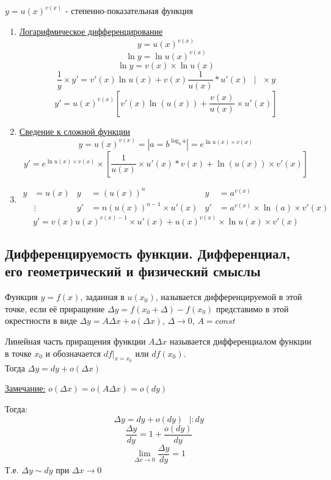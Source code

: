 \documentclass[12pt]{article}
\begin{document}
\begin{enumerate}
        $y = u(x)^{v(x)}$ - степенно-показательная функция
        \begin{enumerate}
            \item \underline{Логарифмическое дифференцирование}\\
            \[ y = u(x)^{v(x)} \]
            \[ \ln y = \ln u(x)^{v(x)} \]
            \[ \ln y = v(x) \times \ln u(x) \]
            \[ \frac{1}{y} \times y' = v'(x)\ln u(x) + v(x)\frac{1}{u(x)}*u'(x) \text{ } \big| \text{ } \times y \]
            \[ y' = u(x)^{v(x)}\left[v'(x)\ln(u(x)) + \frac{v(x)}{u(x)} \times u'(x)\right] \]
            \item \underline{Сведение к сложной функции}
            \[ y = u(x)^{v(x)} = \left|a = b^{\log_b a}\right| = e^{\ln u(x) \times v(x)} \]
            \[ y' = e^{\ln u(x) \times v(x)} \times \left[ \frac{1}{u(x)} \times u'(x)*v(x) + \ln(u(x)) \times v'(x) \right] \]
            \item \begin{align*}
                y &= u(x) & y &= (u(x))^n & y &= a^{v(x)}\\
                &\vdots & y' &= n(u(x))^{n-1} \times u'(x) & y' &= a^{v(x)} \times \ln(a) \times v'(x)
            \end{align*}
            \[ y' = v(x)u(x)^{v(x)-1} \times u'(x) + u(x)^{v(x)} \times \ln u(x) \times v'(x) \]
        \end{enumerate}
    \end{enumerate}

    \subsection{Дифференцируемость функции. Дифференциал, его геометрический и физический смыслы}\noindent
    Функция $y = f(x)$, заданная в $u(x_0)$, называется дифференцируемой в этой точке, если её приращение $\Delta y = f(x_0 + \Delta) - f(x_0)$ представимо в этой окрестности в виде $\Delta y = A\Delta x + o(\Delta x)$, $\Delta \to 0$, $A = const$\par\noindent
    Линейная часть приращения функции $A\Delta x $ называется дифференциалом функции в точке $x_0$ и обозначается $df\Big|_{x = x_0}$ или $df(x_0)$.\\
    Тогда $\Delta y = dy+o(\Delta x)$\par\noindent
    \underline{Замечание:} $o(\Delta x)=o(A\Delta x)=o(dy)$
    \begin{adjustwidth}{1.5em}{1.5em}
        Тогда:
        \[\Delta y = dy + o(dy)\,\,\,\,\Big| : dy\]
        \[\frac{\Delta y}{dy}=1+\frac{o(dy)}{dy}\]
        \[\lim_{\Delta x \to 0}{\frac{\Delta y}{dy}}=1\]
        Т.е. $\Delta y \sim dy $ при $\Delta x \to 0$
    \end{adjustwidth}
\end{document}
